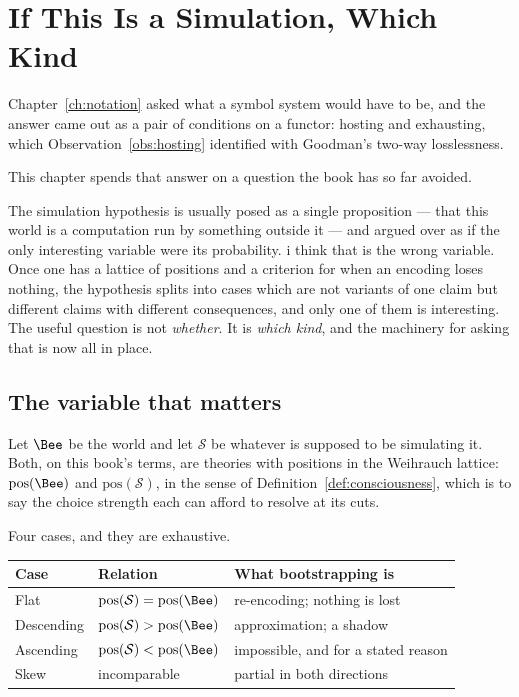 \chapter{If This Is a Simulation, Which Kind}
\label{ch:sim}

Chapter~\ref{ch:notation} asked what a symbol system would have to be, and
the answer came out as a pair of conditions on a functor: hosting and
exhausting, which Observation~\ref{obs:hosting} identified with Goodman's
two-way losslessness.

This chapter spends that answer on a question the book has so far avoided.

The simulation hypothesis is usually posed as a single proposition ---
that this world is a computation run by something outside it --- and
argued over as if the only interesting variable were its probability.
i think that is the wrong variable.
Once one has a lattice of positions and a criterion for when an encoding
loses nothing, the hypothesis splits into cases which are not variants of
one claim but different claims with different consequences, and only one
of them is interesting.
The useful question is not \emph{whether}.
It is \emph{which kind}, and the machinery for asking that is now all in
place.

\section{The variable that matters}

Let $\Bee$ be the world and let $\mathcal{S}$ be whatever is supposed to
be simulating it.
Both, on this book's terms, are theories with positions in the Weihrauch
lattice: $\mathrm{pos}(\Bee)$ and $\mathrm{pos}(\mathcal{S})$, in the
sense of Definition~\ref{def:consciousness}, which is to say the choice
strength each can afford to resolve at its cuts.

Four cases, and they are exhaustive.

\begin{center}
\renewcommand{\arraystretch}{1.4}
\small
\begin{tabular}{lll}
\toprule
\textbf{Case} & \textbf{Relation} & \textbf{What bootstrapping is} \\
\midrule
Flat & $\mathrm{pos}(\mathcal{S}) = \mathrm{pos}(\Bee)$
     & re-encoding; nothing is lost \\
Descending & $\mathrm{pos}(\mathcal{S}) > \mathrm{pos}(\Bee)$
     & approximation; a shadow \\
Ascending & $\mathrm{pos}(\mathcal{S}) < \mathrm{pos}(\Bee)$
     & impossible, and for a stated reason \\
Skew & incomparable
     & partial in both directions \\
\bottomrule
\end{tabular}
\end{center}

